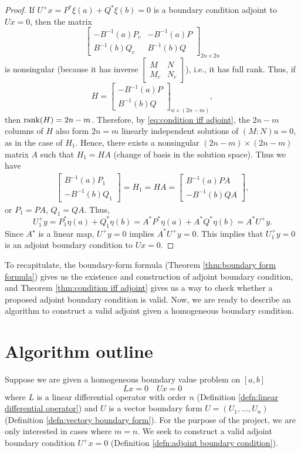 \documentclass[11pt, oneside, a4paper]{article}
\begin{document}
\begin{proof}
    If $U^+x=P^*\xi(a) + Q^*\xi(b)=0$ is a boundary condition adjoint to $Ux=0$, then the matrix
    \[\begin{bmatrix}
        -B^{-1}(a)P_c & -B^{-1}(a)P\\
        B^{-1}(b)Q_c & B^{-1}(b)Q
    \end{bmatrix}_{2n\times 2n}\]
is nonsingular (because it has inverse $\begin{bmatrix}M & N\\ M_c & N_c\end{bmatrix}$), i.e., it has full rank. Thus, if 
    \[H = \begin{bmatrix}
        -B^{-1}(a)P\\
        B^{-1}(b)Q
    \end{bmatrix}_{n\times (2n-m)},\]
    then $\operatorname{rank}(H)=2n-m$. Therefore, by \eqref{eq:condition iff adjoint}, the $2n-m$ columns of $H$ also form $2n=m$ linearly independent solutions of $(M:N)u=0$, as in the case of $H_1$. Hence, there exists a nonsingular $(2n-m)\times (2n-m)$ matrix $A$ such that $H_1=HA$ (change of basis in the solution space). 
    Thus we have
    \begin{align*}
        \begin{bmatrix}
            B^{-1}(a)P_1\\
            -B^{-1}(b)Q_1
        \end{bmatrix} = H_1 = HA = \begin{bmatrix}
            B^{-1}(a)PA\\
            -B^{-1}(b)QA
        \end{bmatrix},
    \end{align*}
    or $P_1=PA$, $Q_1=QA$. Thus, 
    \[U_1^+y = P_1^*\eta(a) + Q_1^*\eta(b) = A^*P^*\eta(a) + A^*Q^*\eta(b)= A^* U^+y.\]
    Since $A^\star$ is a linear map, $U^+y=0$ implies $A^*U^+y=0$. This implies that $U_1^+y=0$ is an adjoint boundary condition to $Ux=0$.
\end{proof}

To recapitulate, the boundary-form formula (Theorem \ref{thm:boundary form formula}) gives us the existence and construction of adjoint boundary condition, and Theorem \ref{thm:condition iff adjoint} gives us a way to check whether a proposed adjoint boundary condition is valid. Now, we are ready to describe an algorithm to construct a valid adjoint given a homogeneous boundary condition.

\section{Algorithm outline}
Suppose we are given a homogeneous boundary value problem on $[a,b]$
\[Lx=0\quad Ux=0\]
where $L$ is a linear differential operator with order $n$ (Definition \ref{defn:linear differential operator}) and $U$ is a vector boundary form $U=(U_1,\ldots, U_n)$ (Definition \ref{defn:vectory boundary form}). For the purpose of the project, we are only interested in cases where $m=n$. We seek to construct a valid adjoint boundary condition $U^+x=0$ (Definition \ref{defn:adjoint boundary condition}). 
\end{document}
